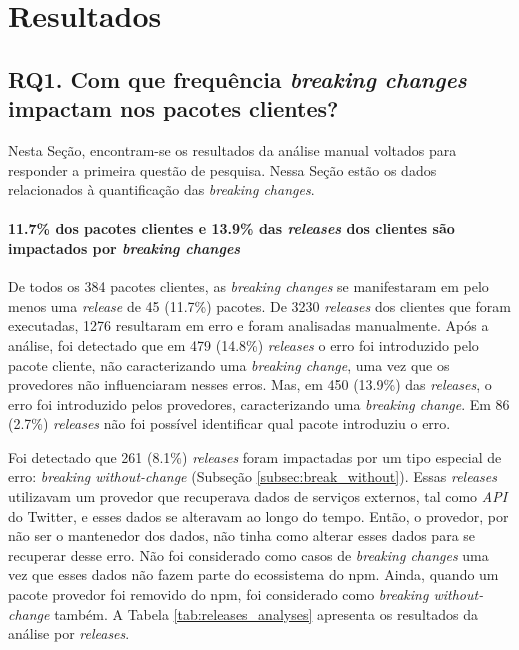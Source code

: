 \chapter{Resultados}
\label{cap:results}

\section{RQ1. Com que frequência \textit{breaking changes} impactam nos pacotes clientes?}

Nesta Seção, encontram-se os resultados da análise manual voltados para responder a primeira questão de pesquisa. Nessa Seção estão os dados relacionados à quantificação das \textit{breaking changes}.

\subsubsection{11.7\% dos pacotes clientes e 13.9\% das \textit{releases} dos clientes são impactados por \textit{breaking changes}}
De todos os 384 pacotes clientes, as \textit{breaking changes} se manifestaram em pelo menos uma \textit{release} de 45 (11.7\%) pacotes. De 3230 \textit{releases} dos clientes que foram executadas, 1276 resultaram em erro e foram analisadas manualmente. Após a análise, foi detectado que em 479 (14.8\%) \textit{releases} o erro foi introduzido pelo pacote cliente, não caracterizando uma \textit{breaking change}, uma vez que os provedores não influenciaram nesses erros. Mas, em 450 (13.9\%) das \textit{releases}, o erro foi introduzido pelos provedores, caracterizando uma \textit{breaking change}. Em 86 (2.7\%) \textit{releases} não foi possível identificar qual pacote introduziu o erro.

Foi detectado que 261 (8.1\%) \textit{releases} foram impactadas por um tipo especial de erro: \textit{breaking without-change} (Subseção \ref{subsec:break_without}). Essas \textit{releases} utilizavam um provedor que recuperava dados de serviços externos, tal como \textit{API} do \textsf{Twitter}, e esses dados se alteravam ao longo do tempo. Então, o provedor, por não ser o mantenedor dos dados, não tinha como alterar esses dados para se recuperar desse erro. Não foi considerado como casos de \textit{breaking changes} uma vez que esses dados não fazem parte do ecossistema do \textsf{npm}. Ainda, quando um pacote provedor foi removido do \textsf{npm}, foi considerado como \textit{breaking without-change} também. A Tabela \ref{tab:releases_analyses} apresenta os resultados da análise por \textit{releases}.

